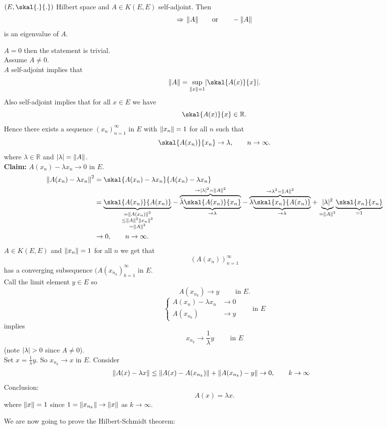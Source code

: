 \begin{proposition}
	$(E, \skal{.}{.})$ Hilbert space and $A \in K(E,E)$ self-adjoint. Then
	\[
		\Rightarrow \,\norm{A} \qquad \text{or} \qquad  - \norm{A}
	\]
	is an eigenvalue of $A$.
\end{proposition}
\begin{beweis}
	$A = 0$ then the statement is trivial. \\
	Assume $A \neq 0$. \\
	$A$ self-adjoint implies that 
	\[
		\norm{A} = \sup_{\norm{x}=1} \abs{\skal{A(x)}{x}}.
	\]
	Also self-adjoint implies that for all $x \in E$ we have
	\[
		\skal{A(x)}{x} \in \mathbb{R}.
	\]
	Hence there exists a sequence $(x_n)_{n=1}^{\infty}$ in $E$ with $\norm{x_n}=1$ for all $n$ such that
	\[
		\skal{A(x_n)}{x_n} \to \lambda, \qquad n \to \infty.
	\]
	where $\lambda \in \mathbb{R}$ and $\abs{\lambda} = \norm{A}$. \\
	\textbf{Claim:} \text{    }$A(x_n) - \lambda x_n \to 0$ in $E$. \\
	\begin{align*}
		\norm{A(x_n)- \lambda x_n}^2 &= \skal{A(x_n)-\lambda x_n}{A(x_n)- \lambda x_n} \\
		&= \underset{\substack{= \norm{A(x_n)}^2 \\ \leq \norm{A}^2 \norm{x_n}^2 \\ = \norm{A}^2}}{\underbrace{\skal{A(x_n)}{A(x_n)}}}- 
		\overset{\to \abs{\lambda}^2 = \norm{A}^2}{\overbrace{\bar{\lambda} 
		\underset{ \to  \lambda}{\underbrace{\skal{A(x_n)}{x_n}}}}}- \overset{\to \lambda^2 = \norm{A}^2}{\overbrace{\lambda \underset{\to \lambda}{\underbrace{\skal{x_n}{A(x_n)}}}}} + \underset{= \norm{A}^2}{\underbrace{\abs{\lambda}^2}} \underset{=1}{\underbrace{\skal{x_n}{x_n}}} \\
		&\to 0, \qquad n \to \infty.
	\end{align*}
	$A \in K(E,E)$ and $\norm{x_n}=1$ for all $n$ we get that 
	\[
		(A(x_n))_{n=1}^{\infty} 
	\]
	has a converging subsequence $(A(x_{n_k})_{k=1}^{\infty}$ in $E$. \\
	Call the limit element $y \in E$ so
	\[
		A(x _{n_k}) \to y \qquad \text{ in }E. 
	\]
	\[
		\begin{cases}
			A(x_n) - \lambda x_n &\to 0\\
			A(x _{n_k}) &\to y
		\end{cases} \qquad \text{in }E
	\]
	implies
	\[
		x _{n_k} \to  \frac{1}{\lambda}y \qquad \text{ in }E
	\]
	(note $\lvert\lambda\rvert>0$ since $A \neq 0$). \\
	Set $x = \frac{1}{\lambda}y$. So $x _{n_k} \to x$ in $E$. Consider
	\begin{align*}
		\norm{A(x)- \lambda x} &\leq  \norm{A(x)-A(x _{n_k})} + \norm{A(x _{n_k})- y} \to 0, \qquad k \to \infty
	\end{align*}
	Conclusion: \[
		A(x) = \lambda x.
	\]
	where $\norm{x}=1$ since $1 = \norm{x _{n_k}} \to  \norm{x}$ as $k \to \infty$.
\end{beweis}
We are now going to prove the Hilbert-Schmidt theorem:

